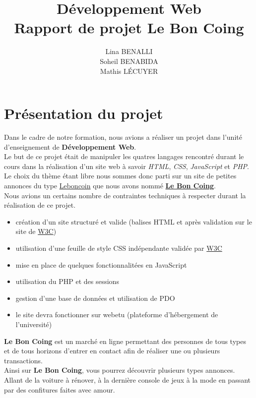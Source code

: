 \documentclass[11pt,a4paper]{article}
\title{Développement Web\\Rapport de projet \textbf{Le Bon Coing}}
\author{Lina BENALLI\\Soheil BENABIDA\\Mathis LÉCUYER}
\date{}
\begin{document}
\maketitle

\newpage

\tableofcontents

\newpage

\section{Présentation du projet}
Dans le cadre de notre formation, nous avions a réaliser un projet dans l'unité d'enseignement de \textbf{Développement Web}.\\
Le but de ce projet était de manipuler les quatres langages rencontré durant le cours dans la réalisation d'un site web à savoir \emph{HTML}, \emph{CSS}, \emph{JavaScript} et \emph{PHP}.\\
Le choix du thème étant libre nous sommes donc parti sur un site de petites annonces du type \underline{Leboncoin} que nous avons nommé \underline{\textbf{Le Bon Coing}}.\\
Nous avions un certains nombre de contraintes techniques à respecter durant la réalisation de ce projet. 
\begin{itemize}
    \item création d'un site structuré et valide (balises HTML et après validation sur le site de \href{https://validator.w3.org}{W3C})
    \item utilisation d'une feuille de style CSS indépendante validée par \href{https://jigsaw.w3.org/css-validator/}{W3C}
    \item mise en place de quelques fonctionnalitées en JavaScript
    \item utilisation du PHP et des sessions
    \item gestion d'une base de données et utilisation de PDO
    \item le site devra fonctionner sur webetu (plateforme d'hébergement de l'université)
\end{itemize}

\textbf{Le Bon Coing} est un marché en ligne permettant des personnes de tous types et de tous horizons d'entrer en contact afin de réaliser une ou plusieurs transactions.\\
Ainsi sur \textbf{Le Bon Coing}, vous pourrez découvrir plusieurs types annonces. Allant de la voiture à rénover, à la dernière console de jeux à la mode en passant par des confitures faites avec amour.
\end{document}
